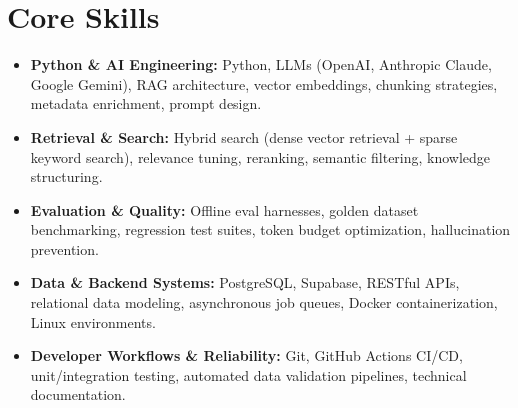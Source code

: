 \documentclass[a4paper,10pt]{article}
\begin{document}
\section{Core Skills}
\begin{itemize}
 \item \textbf{Python \& AI Engineering:} Python, LLMs (OpenAI, Anthropic Claude, Google Gemini), RAG architecture, vector embeddings, chunking strategies, metadata enrichment, prompt design.
 \item \textbf{Retrieval \& Search:} Hybrid search (dense vector retrieval + sparse keyword search), relevance tuning, reranking, semantic filtering, knowledge structuring.
 \item \textbf{Evaluation \& Quality:} Offline eval harnesses, golden dataset benchmarking, regression test suites, token budget optimization, hallucination prevention.
 \item \textbf{Data \& Backend Systems:} PostgreSQL, Supabase, RESTful APIs, relational data modeling, asynchronous job queues, Docker containerization, Linux environments.
 \item \textbf{Developer Workflows \& Reliability:} Git, GitHub Actions CI/CD, unit/integration testing, automated data validation pipelines, technical documentation.
\end{itemize}
\end{document}
